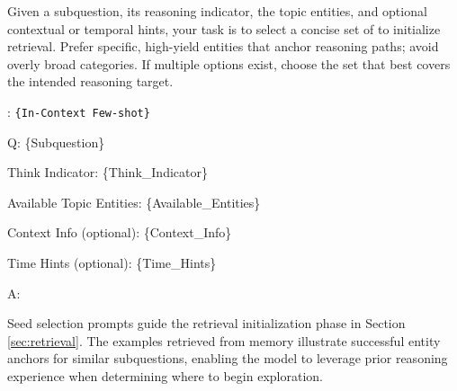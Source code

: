 \vspace{6mm}

\begin{center}
\begin{minipage}{0.9\columnwidth}
    \vspace{2mm}
    \centering
    \begin{tcolorbox}[title=Seed Selection Prompt Template]
        \small
Given a subquestion, its reasoning indicator, the topic entities, and optional contextual or temporal hints, your task is to select a concise set of  to initialize retrieval.  
Prefer specific, high-yield entities that anchor reasoning paths; avoid overly broad categories.  
If multiple options exist, choose the  set that best covers the intended reasoning target.

\vspace{5pt}
:
\texttt{\{In-Context Few-shot\}}
\vspace{5pt}

Q: \{Subquestion\}

Think Indicator: \{Think\_Indicator\}

Available Topic Entities: \{Available\_Entities\}

Context Info (optional): \{Context\_Info\}

Time Hints (optional): \{Time\_Hints\}

A:
    \end{tcolorbox}
\end{minipage}
\end{center}
\vspace{3mm}

\noindent
Seed selection prompts guide the retrieval initialization phase in Section \ref{sec:retrieval}.  
The examples retrieved from memory illustrate successful entity anchors for similar subquestions, enabling the model to leverage prior reasoning experience when determining where to begin exploration.



